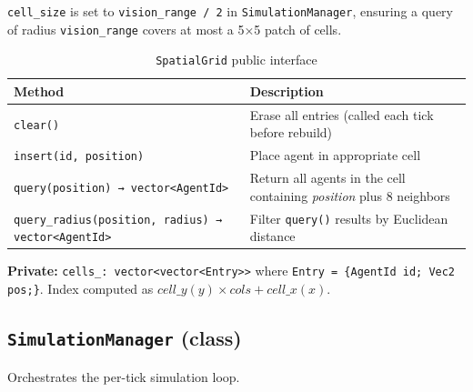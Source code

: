 \texttt{cell\_size} is set to \texttt{vision\_range / 2} in \texttt{SimulationManager},
ensuring a query of radius \texttt{vision\_range} covers at most a 5×5 patch of cells.

\begin{table}[H]
\centering\small
\caption{\texttt{SpatialGrid} public interface}
\begin{tabularx}{\textwidth}{@{}lX@{}}
\toprule
\textbf{Method} & \textbf{Description} \\
\midrule
\texttt{clear()} & Erase all entries (called each tick before rebuild) \\
\texttt{insert(id, position)} & Place agent in appropriate cell \\
\texttt{query(position) → vector<AgentId>} & Return all agents in the cell containing \emph{position} plus 8 neighbors \\
\texttt{query\_radius(position, radius) → vector<AgentId>} & Filter \texttt{query()} results by Euclidean distance \\
\bottomrule
\end{tabularx}
\end{table}

\textbf{Private:} \texttt{cells\_: vector<vector<Entry>>} where
\texttt{Entry = \{AgentId id; Vec2 pos;\}}.
Index computed as $\mathit{cell\_y}(y) \times \mathit{cols} + \mathit{cell\_x}(x)$.

\subsection{\texttt{SimulationManager} (class)}

Orchestrates the per-tick simulation loop.

